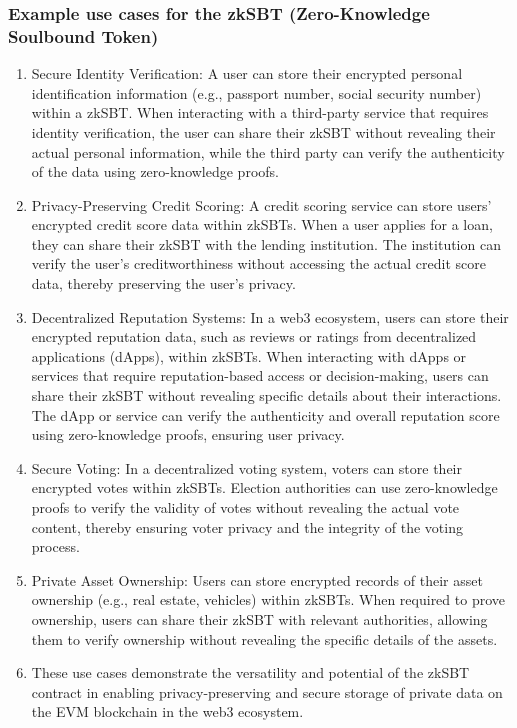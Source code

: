 \documentclass{article}
\begin{document}
\subsubsection{Example use cases for the zkSBT (Zero-Knowledge Soulbound Token)}
\begin{enumerate}
\item Secure Identity Verification: A user can store their encrypted personal identification information (e.g., passport number, social security number) within a zkSBT. When interacting with a third-party service that requires identity verification, the user can share their zkSBT without revealing their actual personal information, while the third party can verify the authenticity of the data using zero-knowledge proofs.
\item Privacy-Preserving Credit Scoring: A credit scoring service can store users' encrypted credit score data within zkSBTs. When a user applies for a loan, they can share their zkSBT with the lending institution. The institution can verify the user's creditworthiness without accessing the actual credit score data, thereby preserving the user's privacy.
\item Decentralized Reputation Systems: In a web3 ecosystem, users can store their encrypted reputation data, such as reviews or ratings from decentralized applications (dApps), within zkSBTs. When interacting with dApps or services that require reputation-based access or decision-making, users can share their zkSBT without revealing specific details about their interactions. The dApp or service can verify the authenticity and overall reputation score using zero-knowledge proofs, ensuring user privacy.
\item Secure Voting: In a decentralized voting system, voters can store their encrypted votes within zkSBTs. Election authorities can use zero-knowledge proofs to verify the validity of votes without revealing the actual vote content, thereby ensuring voter privacy and the integrity of the voting process.
\item Private Asset Ownership: Users can store encrypted records of their asset ownership (e.g., real estate, vehicles) within zkSBTs. When required to prove ownership, users can share their zkSBT with relevant authorities, allowing them to verify ownership without revealing the specific details of the assets.
\item These use cases demonstrate the versatility and potential of the zkSBT contract in enabling privacy-preserving and secure storage of private data on the EVM blockchain in the web3 ecosystem.
\end{enumerate}
\end{document}
